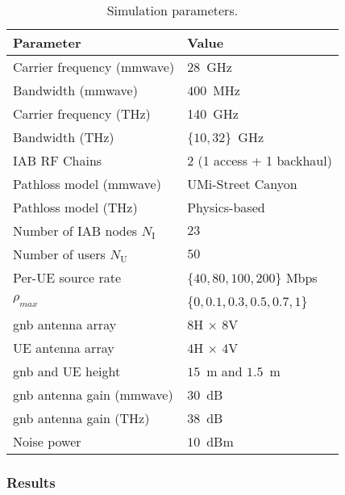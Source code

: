 \begin{table}[]
\caption{Simulation parameters.}
\label{Tab:parameters-iab-thz}
\centering
\footnotesize
\begin{tabular}{l|l}
    \toprule
    Parameter & Value \\ \midrule

    Carrier frequency (\gls{mmwave}) & $28$~GHz \\
    Bandwidth (\gls{mmwave}) & $400$~MHz \\
    Carrier frequency (THz) & 140~GHz  \\
    Bandwidth (THz) & $\{ 10,32 \}$~GHz \\
    IAB RF Chains & 2 (1 access + 1 backhaul) \\
    Pathloss model (\gls{mmwave}) & UMi-Street Canyon~\cite{3gpp.38.901} \\
    Pathloss model (THz) &  Physics-based~\cite{5995306} \\
    Number of IAB nodes $N_{\mathrm{I}}$ & $23$  \\
    Number of users $N_{\mathrm{U}}$ & $50$   \\
    Per-UE source rate & \{$40, 80, 100, 200$\} Mbps \\
    $\rho_{max}$ & \{$0, 0.1, 0.3, 0.5, 0.7, 1$\} \\
    \gls{gnb} antenna array & $8$H $\times$ $8$V\\
    UE antenna array & $4$H $\times$ $4$V\\
    \gls{gnb} and UE height & $15$~m and $1.5$~m \\
    \gls{gnb} antenna gain (\gls{mmwave}) & $30$~dB \\
    \gls{gnb} antenna gain (THz) & $38$~dB \\
    Noise power & $10$~dBm \\
\bottomrule
\end{tabular}
\end{table}

\subsubsection{Results}
\label{sub:results-iab-thz}

